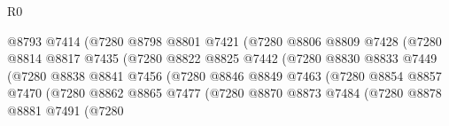 \begin{lexlean}{R0}
\begin{coremodule}
                                      @8793
                                      @7414
                                      (@7280
                                        @8798
                                        @8801
                                        @7421
                                        (@7280
                                          @8806
                                          @8809
                                          @7428
                                          (@7280
                                            @8814
                                            @8817
                                            @7435
                                            (@7280
                                              @8822
                                              @8825
                                              @7442
                                              (@7280
                                                @8830
                                                @8833
                                                @7449
                                                (@7280
                                                  @8838
                                                  @8841
                                                  @7456
                                                  (@7280
                                                    @8846
                                                    @8849
                                                    @7463
                                                    (@7280
                                                      @8854
                                                      @8857
                                                      @7470
                                                      (@7280
                                                        @8862
                                                        @8865
                                                        @7477
                                                        (@7280
                                                          @8870
                                                          @8873
                                                          @7484
                                                          (@7280
                                                            @8878
                                                            @8881
                                                            @7491
                                                            (@7280

\end{coremodule}
\end{lexlean}
